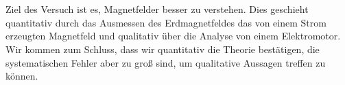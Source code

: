\section*{\abstractname}
\label{sec:zusammenfassung}


Ziel des Versuch ist es, Magnetfelder besser zu verstehen. Dies geschieht quantitativ durch das Ausmessen des Erdmagnetfeldes das von einem Strom erzeugten Magnetfeld und qualitativ über die Analyse von einem Elektromotor. Wir kommen zum Schluss, dass wir quantitativ die Theorie bestätigen, die systematischen Fehler aber zu groß sind, um qualitative Aussagen treffen zu können.

\vspace{3cm}